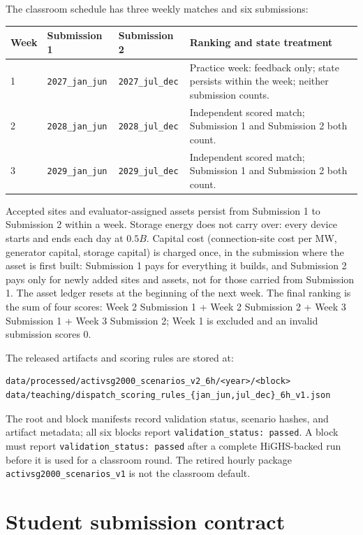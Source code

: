 \documentclass[12pt]{article}
\newcommand{\code}[1]{\texttt{#1}}
\begin{document}
The classroom schedule has three weekly matches and six submissions:
\begin{center}
\small
\begin{tabularx}{0.96\textwidth}{l l l X}
\toprule
Week & Submission 1 & Submission 2 & Ranking and state treatment\\
\midrule
1 & \code{2027\_jan\_jun} & \code{2027\_jul\_dec} & Practice week: feedback only; state persists within the week; neither submission counts.\\
2 & \code{2028\_jan\_jun} & \code{2028\_jul\_dec} & Independent scored match; Submission 1 and Submission 2 both count.\\
3 & \code{2029\_jan\_jun} & \code{2029\_jul\_dec} & Independent scored match; Submission 1 and Submission 2 both count.\\
\bottomrule
\end{tabularx}
\end{center}

Accepted sites and evaluator-assigned assets persist from Submission 1 to
Submission 2 within a week. Storage energy does not carry over: every device
starts and ends each day at $0.5B$. Capital cost (connection-site
cost per MW, generator capital, storage capital) is charged once, in the
submission where the asset is first built: Submission 1 pays for everything it
builds, and Submission 2 pays only for newly added sites and assets, not for
those carried from Submission 1. The asset ledger resets at the
beginning of the next week. The final ranking is the sum of four scores:
Week 2 Submission 1 + Week 2 Submission 2 + Week 3 Submission 1 + Week 3
Submission 2; Week 1 is excluded and an invalid submission scores 0.

The released artifacts and scoring rules are stored at:
\begin{lstlisting}
data/processed/activsg2000_scenarios_v2_6h/<year>/<block>
data/teaching/dispatch_scoring_rules_{jan_jun,jul_dec}_6h_v1.json
\end{lstlisting}
The root and block manifests record validation status, scenario hashes, and
artifact metadata; all six blocks report \code{validation\_status: passed}.
A block must report \code{validation\_status: passed} after a complete
HiGHS-backed run before it is used for a classroom round. The retired hourly
package \code{activsg2000\_scenarios\_v1} is not the classroom default.

\section{Student submission contract}
\end{document}
